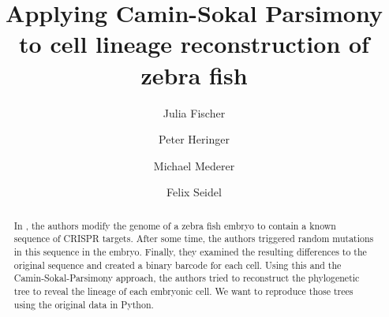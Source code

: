 \documentclass{article}
\title{Applying Camin-Sokal Parsimony to cell lineage reconstruction of zebra fish}
\author{Julia Fischer 
\and 
Peter Heringer
\and
Michael Mederer
\and
Felix Seidel}
\begin{document}
\maketitle
\begin{abstract}
In \cite{mckenna_whole-organism_2016}, the authors modify the genome of a zebra
fish embryo to contain a known sequence of CRISPR targets. After some time, the
authors triggered random mutations in this sequence in the embryo. Finally, they examined the
resulting differences to the original sequence and created a
binary barcode for each cell. Using this and the Camin-Sokal-Parsimony approach,
the authors tried to reconstruct the phylogenetic tree to reveal the lineage of
each embryonic cell. We want to reproduce those trees using the original data in
Python. 
\end{abstract}

\printbibliography
    
\end{document}
